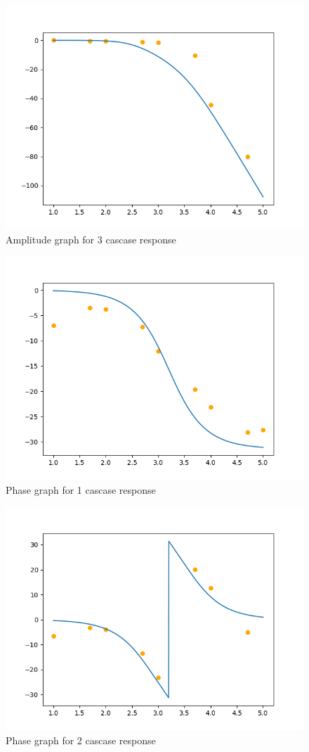 \documentclass[journal]{IEEEtran}
\begin{document}
\begin{figure}[h]
    \centering
    \includegraphics[width=0.7\columnwidth]{figs/Afig3.png}
    \caption{Amplitude graph for 3 cascase response}
\end{figure}

\begin{figure}[h]
    \centering
    \includegraphics[width=0.7\columnwidth]{figs/Pfig1.png}
    \caption{Phase graph for 1 cascase response}
\end{figure}

\begin{figure}[h]
    \centering
    \includegraphics[width=0.7\columnwidth]{figs/Pfig2.png}
    \caption{Phase graph for 2 cascase response}
\end{figure}
\end{document}
